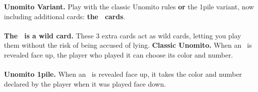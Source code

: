 \documentclass[a4paper]{memoir}
\begin{document}
{\footnotesize

\noindent
\textbf{ Unomito Variant.} Play with the classic Unomito rules \textbf{or} the 1pile variant, now including additional cards: \textbf{the \infty~cards}.
\\
\\
\noindent
\textbf{ The \infty~is a wild card.} These 3 extra cards act as wild cards, letting you play them without the risk of being accused of lying.
\newpage
\noindent
\textbf{ Classic Unomito.} When an \infty~is revealed face up, the player who played it can choose its color and number.
\\
\\
\noindent
\textbf{ Unomito 1pile.} When an \infty~is revealed face up, it takes the color and number declared by the player when it was played face down.
}
\end{document}
